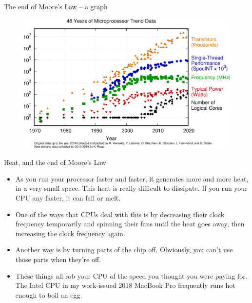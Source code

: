 \documentclass{beamer}
\begin{document}
\begin{frame}{The end of Moore's Law -- a graph}
	\begin{figure}
		\includegraphics[scale=0.2]{48-years-processor-trend.png}
	\end{figure}
\end{frame}

\begin{frame}{Heat, and the end of Moore's Law}
	\begin{itemize}
	\item As you run your processor faster and faster, it generates more and more heat, in a
	very small space. This heat is really difficult to dissipate. If you run your
	CPU any faster, it can fail or melt.

	\item One of the ways that CPUs deal with this is by decreasing their clock
	frequency temporarily and spinning their fans until the heat goes away, then
	increasing the clock frequency again.
	
	\item Another way is by turning parts of the chip off. Obviously, you can't use
	those parts when they're off.

	\item These things all rob your CPU of the speed you thought you were paying
	for.  The Intel CPU in my work-issued 2018 MacBook Pro frequently runs hot enough to boil
	an egg.
	
	\end{itemize}
\end{frame}
\end{document}
